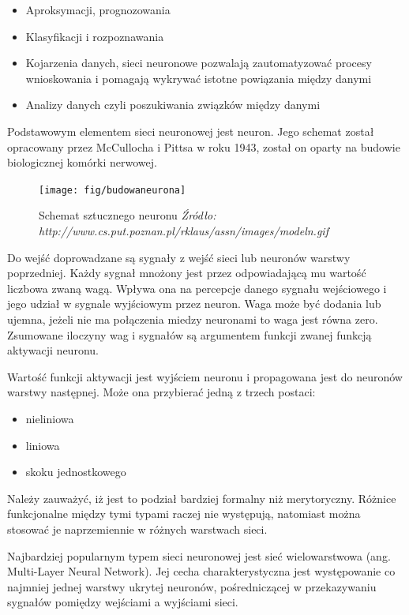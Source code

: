 \documentclass[brudnopis]{xmgr}
\begin{document}
\begin{itemize}
\item
Aproksymacji, prognozowania
\item
Klasyfikacji i rozpoznawania
\item
Kojarzenia danych, sieci neuronowe pozwalają zautomatyzować procesy wnioskowania i pomagają wykrywać istotne powiązania między danymi
\item
Analizy danych czyli poszukiwania związków między danymi
\end{itemize}

Podstawowym elementem sieci neuronowej jest neuron. Jego schemat został opracowany przez McCullocha i Pittsa w roku 1943, został on oparty na budowie biologicznej komórki nerwowej.

\begin{figure}[!tbh]
\centering
\texttt{[image: fig/budowaneurona]}
\caption{Schemat sztucznego neuronu \emph{Źródło: http://www.cs.put.poznan.pl/rklaus/assn/images/modeln.gif}}
\end{figure}

Do wejść doprowadzane są sygnały z wejść sieci lub neuronów warstwy poprzedniej. Każdy sygnał mnożony jest przez odpowiadającą mu wartość liczbowa zwaną wagą. Wpływa ona na percepcje danego sygnału wejściowego i jego udział w sygnale wyjściowym przez neuron. Waga może być dodania lub ujemna, jeżeli nie ma połączenia miedzy neuronami to waga jest równa zero. Zsumowane iloczyny wag i sygnałów są argumentem funkcji zwanej funkcją aktywacji neuronu.

Wartość funkcji aktywacji jest wyjściem neuronu i propagowana jest do neuronów warstwy następnej. Może ona przybierać jedną z trzech postaci:
\begin{itemize}
\item
nieliniowa
\item
liniowa
\item
skoku jednostkowego
\end{itemize}
\newpage

Należy zauważyć, iż jest to podział bardziej formalny niż merytoryczny. Różnice funkcjonalne między tymi typami raczej nie występują, natomiast można stosować je naprzemiennie w różnych warstwach sieci.

Najbardziej popularnym typem sieci neuronowej jest sieć wielowarstwowa (ang. Multi-Layer Neural Network). Jej cecha charakterystyczna jest występowanie co najmniej jednej warstwy ukrytej neuronów, pośredniczącej w przekazywaniu sygnałów pomiędzy wejściami a wyjściami sieci.
\end{document}
